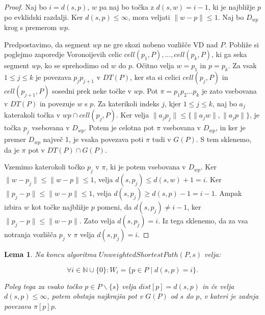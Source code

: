 \documentclass[a4paper, 12pt]{book}
\newcommand{\NN}{\ensuremath{\mathbb N}}  %
\newtheorem{lema}[izrek]{Lema}
\begin{document}
\begin{proof}
Naj bo $i = d(s,p)$, $w$ pa naj bo točka z $d(s,w) = i - 1$, ki je najbližje $p$ po evklidski razdalji. Ker $d(s,p) \le \infty$, mora veljati $\|w - p\| \leq 1$. Naj bo $D_{wp}$ krog s premerom $wp$.

Predpostavimo, da segment $wp$ ne gre skozi nobeno vozlišče VD nad $P$.  Pobliže si poglejmo zaporedje Voronoijevih celic $cell(p_1, P),..., cell(p_k, P)$, ki ga seka segment $wp$, ko se sprehodimo od $w$ do $p$. Očitno velja $w = p_1$ in $p = p_k$. Za vsak $1 \leq j \le k$ je povezava $p_jp_{j+1}$ v $DT(P)$, ker sta si celici $cell(p_j, P)$ in $cell(p_{j+1}, P)$ sosedni prek neke točke v $wp$. Pot $\pi = p_1p_2...p_k$ je zato vsebovana v $DT(P)$ in povezuje $w$ s $p$. Za katerikoli indeks $j$, kjer $1 \le j \le k$, naj bo $a_j$ katerakoli točka v $wp \cap cell(p_j, P)$. Ker velja $\|a_jp_j\| \leq \{\|a_jw\|, \|a_jp\|\}$, je točka $p_j$ vsebovana v $D_{wp}$. Potem je celotna pot $\pi$ vsebovana v $D_{wp}$, in ker je premer $D_{wp}$ največ 1, je vsaka povezava poti $\pi$ tudi v $G(P)$. S tem sklenemo, da je $\pi$ pot v $DT(P) \cap G(P)$.

Vzemimo katerokoli točko $p_j$ v $\pi$, ki je potem vsebovana v $D_{wp}$. Ker $\|w - p_j\| \leq \|w - p\| \leq 1$, velja $d(s, p_j) \leq d(s, w) + 1 = i$. Ker $\|p_j - p\| \leq \|w - p\| \leq 1$, velja $d(s, p_j) \geq d(s, p) - 1 = i - 1$. Ampak izbira $w$ kot točke najbližje $p$ pomeni, da $d(s, p_j) \neq i - 1$, ker $\|p_j - p\| \le \|w - p\|$. Zato velja $d(s, p_j) = i$. Iz tega sklenemo, da za vsa notranja vozlišča $p_j$ v $\pi$ velja $d(s, p_j) = i$. 
\end{proof}

\begin{lema}
\label{lema2}
Na koncu algoritma $UnweightedShortestPath(P, s)$ velja:

\begin{equation}
\forall i \in \NN \cup \{0\}:  W_i = \{p\in P \mid d(s, p) = i\}.
\end{equation}

Poleg tega za vsako točko $p \in P \backslash \{s\}$ velja $dist[p] = d(s,p)$ in če velja $d(s,p) \le \infty$, potem obstaja najkrajša pot v $G(P)$ od $s$ do $p$, v kateri je zadnja povezava $\pi [p]p$.
\end{lema}
\end{document}
